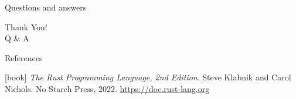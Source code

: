 \begin{frame}{Questions and answers}
    \begin{center}
    {\fontsize{40}{50}\selectfont Thank You! \\[10pt] Q \& A}
    \end{center}
\end{frame}

\begin{frame}[allowframebreaks]{References}
    \begin{thebibliography}{}
        [book]
        \emph{The Rust Programming Language, 2nd Edition}.
        \newblock Steve Klabnik and Carol Nichols.
        \newblock No Starch Press, 2022.
        \newblock \url{https://doc.rust-lang.org}


    \end{thebibliography}
\end{frame}
